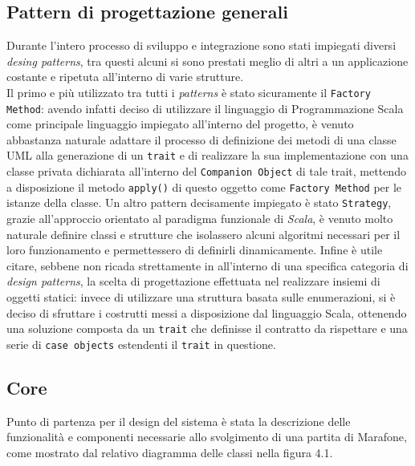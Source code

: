        \subsection {Pattern di progettazione generali}\label{subsec:details:generaldesingpattern}
       Durante l'intero processo di sviluppo e integrazione sono stati impiegati diversi \textit{desing patterns}, tra questi alcuni si sono prestati meglio di altri a un applicazione costante e ripetuta all'interno di varie strutture.\\
       Il primo e più utilizzato tra tutti i \textit{patterns} è stato sicuramente il \texttt{Factory Method}: avendo infatti deciso di utilizzare
       il linguaggio di Programmazione Scala come principale linguaggio impiegato all'interno del progetto, è venuto abbastanza naturale adattare il processo di definizione dei metodi di una classe UML alla generazione di un \texttt{trait} e di realizzare la sua implementazione con una classe privata dichiarata all'interno del \texttt{Companion Object} di tale trait, mettendo a disposizione il metodo \texttt{apply()} di questo oggetto come \texttt{Factory Method} per le istanze della classe.
       Un altro pattern decisamente impiegato è stato \texttt{Strategy}, grazie all'approccio orientato al paradigma funzionale di \textit{Scala}, è venuto molto naturale definire classi e strutture che isolassero alcuni algoritmi necessari per il loro funzionamento e permettessero di definirli dinamicamente.
       Infine è utile citare, sebbene non ricada strettamente in all'interno di una specifica categoria di \textit{design patterns}, la scelta di progettazione effettuata nel realizzare insiemi di oggetti statici: invece di utilizzare una struttura basata sulle enumerazioni, si è deciso di sfruttare i costrutti messi a disposizione dal linguaggio Scala, ottenendo una soluzione composta da un \texttt{trait} che definisse il contratto da rispettare e una serie di \texttt{case objects} estendenti il \texttt{trait} in questione.

       \subsection {Core}\label{subsec:details:core}
       Punto di partenza per il design del sistema è stata la descrizione delle funzionalità e componenti necessarie allo svolgimento di una partita di Marafone, come mostrato dal relativo diagramma delle classi nella figura 4.1.

